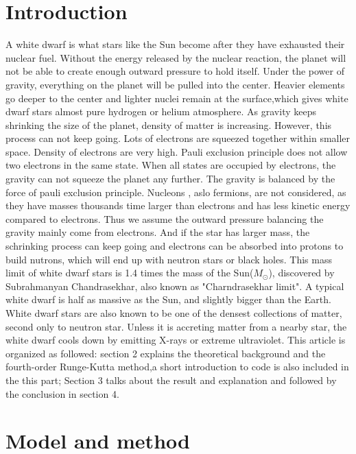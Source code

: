 \documentclass{article}
\begin{document}
\section{Introduction}
A white dwarf is what stars like the Sun become after they have exhausted their nuclear fuel. Without the energy released by the nuclear reaction, the planet will not be able to create enough outward pressure to hold itself. Under the power of gravity, everything on the planet will be pulled into the center. Heavier elements go deeper to the center and lighter nuclei remain at the surface,which gives white dwarf stars almost pure hydrogen or helium atmosphere. As gravity keeps shrinking the size of the planet, density of matter is increasing. However, this process can not keep going. Lots of electrons are squeezed together within smaller space. Density of electrons are very high.  Pauli exclusion principle does not allow two electrons in the same state. When all states are occupied by electrons, the gravity can not squeeze the planet any further. The gravity is balanced by the force of pauli exclusion principle.  Nucleons , aslo fermions, are not considered, as they have masses thousands time larger than electrons and has less kinetic energy compared to electrons. Thus we assume the outward pressure balancing the gravity mainly come from electrons. And if the star has larger mass, the schrinking process can keep going and electrons can be absorbed into protons to build nutrons, which will end up with neutron stars or black holes. This mass limit of white dwarf stars is 1.4 times the mass of the Sun($M_{\odot}$), discovered by Subrahmanyan Chandrasekhar, also known as "Charndrasekhar limit". A typical white dwarf is half as massive as the Sun, and slightly bigger than the Earth. White dwarf stars are also known to be one of the densest collections of matter, second only to neutron star. Unless it is accreting matter from a nearby star, the white dwarf cools down by emitting X-rays or extreme ultraviolet\cite{white}. This article is organized as followed: section 2 explains the theoretical background and the fourth-order Runge-Kutta method,a short introduction to code is also included in the this part; Section 3 talks about the result and explanation and followed by the conclusion in section 4.

\section{Model and method}
\end{document}
